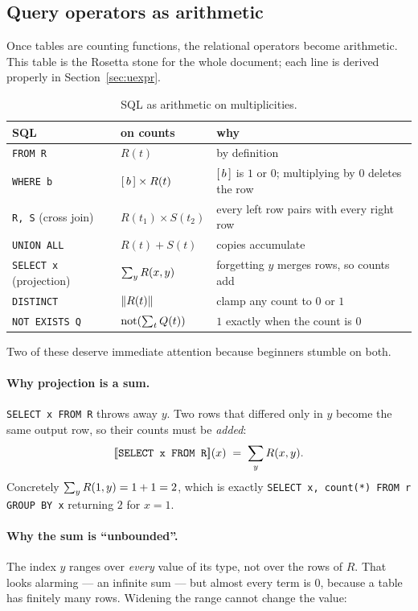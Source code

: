 \subsection{Query operators as arithmetic}

Once tables are counting functions, the relational operators become arithmetic. This table
is the Rosetta stone for the whole document; each line is derived properly in
Section~\ref{sec:uexpr}.

\begin{table}[h]\centering\small
\begin{tabularx}{\linewidth}{@{}l l X@{}}
\toprule
\textbf{SQL} & \textbf{on counts} & \textbf{why} \\
\midrule
\lstinline|FROM R|                & $R(t)$ & by definition \\
\lstinline|WHERE b|               & $[\,b\,]\times R(t)$ & $[\,b\,]$ is $1$ or $0$; multiplying by $0$ deletes the row \\
\lstinline|R, S| (cross join)     & $R(t_1)\times S(t_2)$ & every left row pairs with every right row \\
\lstinline|UNION ALL|             & $R(t)+S(t)$ & copies accumulate \\
\lstinline|SELECT x| (projection) & $\sum_{y} R(x,y)$ & forgetting $y$ merges rows, so counts add \\
\lstinline|DISTINCT|              & $\left\lVert R(t) \right\rVert$ & clamp any count to $0$ or $1$ \\
\lstinline|NOT EXISTS Q|          & $\mathrm{not}(\sum_{t}Q(t))$ & $1$ exactly when the count is $0$ \\
\bottomrule
\end{tabularx}
\caption{SQL as arithmetic on multiplicities.}
\label{tab:rosetta}
\end{table}

Two of these deserve immediate attention because beginners stumble on both.

\paragraph{Why projection is a sum.}
\lstinline|SELECT x FROM R| throws away $y$. Two rows that differed only in $y$ become the
same output row, so their counts must be \emph{added}:
\[
[\![ \texttt{SELECT x FROM R} ]\!](x) \;=\; \sum_{y} R(x,y).
\]
Concretely $\sum_{y}R(1,y) = 1+1 = 2$, which is exactly
\lstinline|SELECT x, count(*) FROM r GROUP BY x| returning $2$ for $x=1$.

\paragraph{Why the sum is ``unbounded''.}
The index $y$ ranges over \emph{every} value of its type, not over the rows of $R$. That
looks alarming --- an infinite sum --- but almost every term is $0$, because a table has
finitely many rows. Widening the range cannot change the value:

